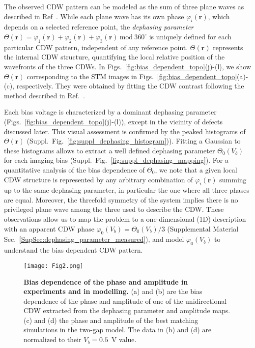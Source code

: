 \documentclass[aps,prl,twocolumn,superscriptaddress]{revtex4-2}
\renewcommand{\v}[1]{\ensuremath{\mathbf{#1}}}
\def \suppsec[#1]{Supplemental Material Sec.~\ref{#1}}
\def \SF[#1]{Suppl.~Fig.~\ref{#1}}
\begin{document}
 The observed CDW pattern can be modeled as the sum of three plane waves as described in Ref~\cite{Pasztor2019}. While each plane wave has its own phase $\varphi_i(\v{r})$, which depends on a selected reference point, the \textit{dephasing parameter} $\Theta(\mathbf{r})=\varphi_1(\v{r})+\varphi_2(\v{r})+\varphi_3(\v{r})~\text{mod}~360^{\circ}$ is uniquely defined for each particular CDW pattern, independent of any reference point. $\Theta(\v{r})$ represents the internal CDW structure, quantifying the local relative position of the wavefronts of the three CDWs. In Figs.~\ref{fig:bias_dependent_topo}(j)-(l), we show $\Theta(\v{r})$ corresponding to the STM images in Figs.~\ref{fig:bias_dependent_topo}(a)-(c), respectively. They were obtained by fitting the CDW contrast following the method described in Ref.~\cite{Pasztor2019}. 

Each bias voltage is characterized by a dominant dephasing parameter (Figs.~\ref{fig:bias_dependent_topo}(j)-(l)), except in the vicinity of defects discussed later. This visual assessment is confirmed by the peaked histograms of $\Theta(\v{r})$ (\SF[fig:suppl_dephasing_histogram])). Fitting a Gaussian to these histograms allows to extract a well defined dephasing parameter $\Theta_0(V_b)$ for each imaging bias (\SF[fig:suppl_dephasing_mapping]). For a quantitative analysis of the bias dependence of $\Theta_0$, we note that a given local CDW structure is represented by any arbitrary combination of $\varphi_i(\v{r})$ summing up to the same dephasing parameter, in particular the one where all three phases are equal. Moreover, the
threefold symmetry of the system implies there is no privileged plane wave among the three used to describe the CDW. These observations allow us to map the problem to a one-dimensional (1D) description with an apparent CDW phase $\varphi_0(V_b)=\Theta_0(V_b)/3$ (\suppsec[SupSec:dephasing_parameter_measured]), and model $\varphi_0(V_b)$ to understand the bias dependent CDW pattern.


\begin{figure}[htp]
\texttt{[image: Fig2.png]}%
\caption{\label{fig:bias_dep_phase_amplitude} \textbf{Bias dependence of the phase and amplitude in experiments and in modelling.} (a) and (b) are the bias dependence of the phase and amplitude of one of the unidirectional CDW extracted from the dephasing parameter and amplitude maps. (c) and (d) the phase and amplitude of the best matching simulations in the two-gap model. The data in (b) and (d) are normalized to their $V_{b}=0.5$~V value.}
\end{figure}
\end{document}
